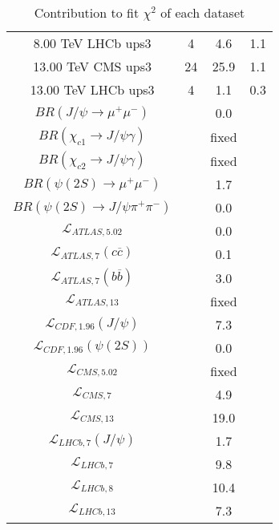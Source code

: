 \begin{table}[h!]
\begin{tabular}{c|c|c|c}
8.00 TeV LHCb ups3 & 4 & 4.6 & 1.1 \\
13.00 TeV CMS ups3 & 24 & 25.9 & 1.1 \\
13.00 TeV LHCb ups3 & 4 & 1.1 & 0.3 \\
\hline
$BR(J/\psi\rightarrow\mu^+\mu^-)$ &  & 0.0 &  \\
$BR(\chi_{c1}\rightarrow J/\psi\gamma)$ &  & fixed & \\
$BR(\chi_{c2}\rightarrow J/\psi\gamma)$ &  & fixed & \\
$BR(\psi(2S)\rightarrow\mu^+\mu^-)$ &  & 1.7 &  \\
$BR(\psi(2S)\rightarrow J/\psi\pi^+\pi^-)$ &  & 0.0 &  \\
$\mathcal L_{ATLAS,5.02}$ &  & 0.0 &  \\
$\mathcal L_{ATLAS,7}(c\overline c)$ &  & 0.1 &  \\
$\mathcal L_{ATLAS,7}(b\overline b)$ &  & 3.0 &  \\
$\mathcal L_{ATLAS,13}$ &  & fixed & \\
$\mathcal L_{CDF,1.96}(J/\psi)$ &  & 7.3 &  \\
$\mathcal L_{CDF,1.96}(\psi(2S))$ &  & 0.0 &  \\
$\mathcal L_{CMS,5.02}$ &  & fixed & \\
$\mathcal L_{CMS,7}$ &  & 4.9 &  \\
$\mathcal L_{CMS,13}$ &  & 19.0 &  \\
$\mathcal L_{LHCb,7}(J/\psi)$ &  & 1.7 &  \\
$\mathcal L_{LHCb,7}$ &  & 9.8 &  \\
$\mathcal L_{LHCb,8}$ &  & 10.4 &  \\
$\mathcal L_{LHCb,13}$ &  & 7.3 &  \\
\end{tabular}
\caption{Contribution to fit $\chi^2$ of each dataset}
\end{table}

